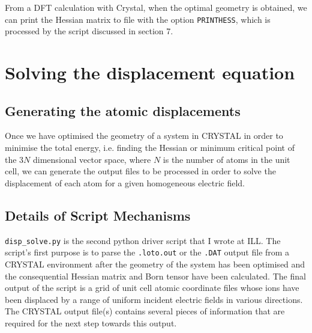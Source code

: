 \documentclass[10pt]{article}
\begin{document}
From a DFT calculation with Crystal, when the optimal geometry is obtained, we can print the Hessian matrix to file with the option \verb|PRINTHESS|, which is processed by the script discussed in section 7.




\section{Solving the displacement equation}
\subsection{Generating the atomic displacements}

Once we have optimised the geometry of a system in CRYSTAL in order to minimise the total energy, i.e. finding the Hessian or minimum critical point of the $3N$ dimensional vector space, where $N$ is the number of atoms in the unit cell, we can generate the output files to be processed in order to solve the displacement of each atom for a given homogeneous electric field. 


\subsection{Details of Script Mechanisms}

\texttt{disp\_solve.py} is the second python driver script that I wrote at ILL. The script's first purpose is to parse the \texttt{.loto.out} or the \texttt{.DAT} output file from a CRYSTAL environment after the geometry of the system has been optimised and the consequential Hessian matrix and Born tensor have been calculated. The final output of the script is a grid of unit cell atomic coordinate files whose ions have been displaced by a range of uniform incident electric fields in various directions. The CRYSTAL output file(s) contains several pieces of information that are required for the next step towards this output.
\end{document}
